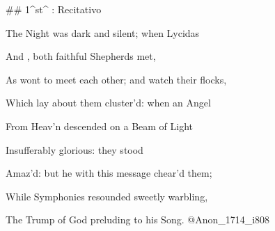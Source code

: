 ## 1^st^ \mvmt: Recitativo

\beginnumbering
\pstart
The Night was dark and silent; when Lycidas 

And , both faithful Shepherds met, 

As wont to meet each other; and watch their flocks, 

Which lay about them cluster’d: when an Angel 

From Heav’n descended on a Beam of Light 

Insufferably glorious: they stood 

Amaz’d: but he with this message chear’d them; 

While Symphonies resounded sweetly warbling, 

The Trump of God preluding to his Song.
\pend
\endnumbering
@Anon_1714_i808
